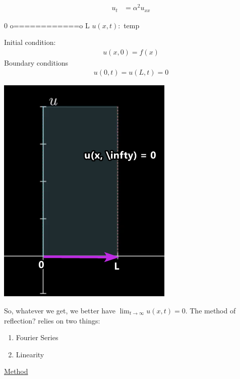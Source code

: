 \documentclass{article}
\begin{document}

\begin{align}
  u_t & = \alpha^2 u_{xx}
\end{align}
\begin{center}
  0 o============o L
  $u(x, t) : $ temp
\end{center}

Initial condition:
\begin{align}
  u(x, 0) = f(x)
\end{align}
Boundary conditions
\begin{align}
  u(0, t) = u(L, t) = 0
\end{align}
\begin{center}
  \includegraphics{FourierReflection}
\end{center}
So, whatever we get, we better have $\displaystyle \lim_{t \to \infty} u(x, t) = 0$. The method of reflection? relies on two things:
\begin{enumerate}
  \item Fourier Series
  \item Linearity
\end{enumerate}
\underline{Method}
\end{document}
